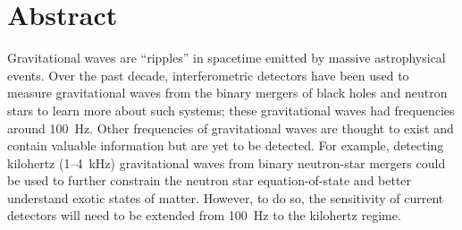 \chapter*{Abstract}


Gravitational waves are ``ripples'' in spacetime emitted by massive astrophysical events. %
Over the past decade, interferometric detectors have been used to measure gravitational waves from the binary mergers of black holes and neutron stars to learn more about such systems; these gravitational waves had frequencies around 100~Hz.
Other frequencies of gravitational waves are thought to exist and contain valuable information but are yet to be detected. For example, detecting kilohertz (1--4~kHz) gravitational waves from binary neutron-star mergers could be used to further constrain the neutron star equation-of-state and better understand exotic states of matter.
However, to do so, the sensitivity of current detectors will need to be extended from 100~Hz to the kilohertz regime. 


